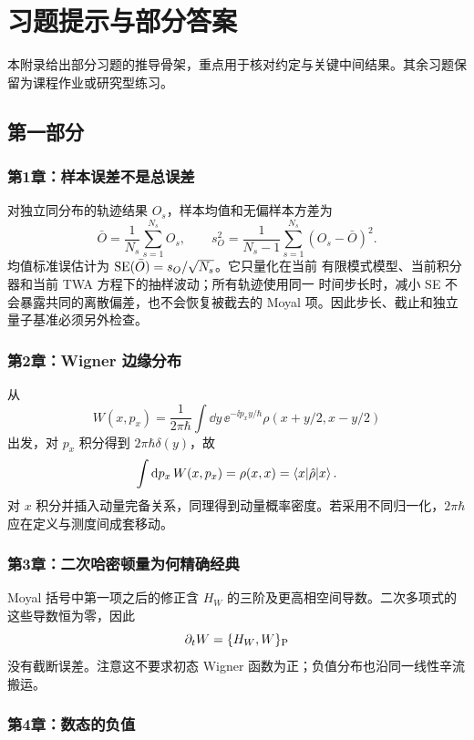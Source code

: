 \chapter{习题提示与部分答案}
\label{app:exercises}

本附录给出部分习题的推导骨架，重点用于核对约定与关键中间结果。其余习题保留为课程作业或研究型练习。

\section{第一部分}

\subsection*{第1章：样本误差不是总误差}

对独立同分布的轨迹结果 $O_s$，样本均值和无偏样本方差为
\[
  \bar O=\frac1{N_s}\sum_{s=1}^{N_s}O_s,
  \qquad
  s_O^2=\frac1{N_s-1}\sum_{s=1}^{N_s}(O_s-\bar O)^2.
\]
均值标准误估计为 ${\rm SE}(\bar O)=s_O/\sqrt{N_s}$。它只量化在当前
有限模式模型、当前积分器和当前 TWA 方程下的抽样波动；所有轨迹使用同一
时间步长时，减小 SE 不会暴露共同的离散偏差，也不会恢复被截去的 Moyal
项。因此步长、截止和独立量子基准必须另外检查。

\subsection*{第2章：Wigner 边缘分布}

从
\[
  W(x,p_x)=\frac1{2\pi\hbar}\int\dd y\,
  \ee^{-\ii p_xy/\hbar}\rho(x+y/2,x-y/2)
\]
出发，对 $p_x$ 积分得到 $2\pi\hbar\delta(y)$，故
\[
  \int\mathop{}\!\mathrm{d} p_x\,W(x,p_x)=\rho(x,x)=\left\langle x|\hat\rho|x\right\rangle.
\]
对 $x$ 积分并插入动量完备关系，同理得到动量概率密度。若采用不同归一化，$2\pi\hbar$ 应在定义与测度间成套移动。

\subsection*{第3章：二次哈密顿量为何精确经典}

Moyal 括号中第一项之后的修正含 $H_W$ 的三阶及更高相空间导数。二次多项式的这些导数恒为零，因此
\[
  \partial_tW=\{H_W,W\}_{\rm P}
\]
没有截断误差。注意这不要求初态 Wigner 函数为正；负值分布也沿同一线性辛流搬运。

\subsection*{第4章：数态的负值}

